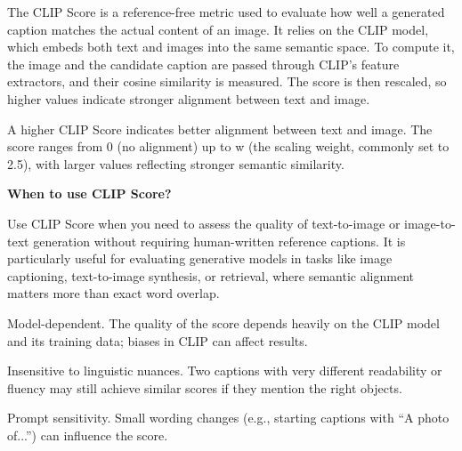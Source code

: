 
The CLIP Score is a reference-free metric used to evaluate how well a generated caption matches the
actual content of an image. It relies on the CLIP model, which embeds both text and images into the same semantic space. To compute it,
the image and the candidate caption are passed through CLIP’s feature extractors, and their cosine similarity is measured. The score is then
rescaled, so higher values indicate stronger alignment between text and image.

\begin{center}
\end{center}

A higher CLIP Score indicates better alignment between text and image. The score ranges from 0 (no alignment) up to w (the scaling weight,
commonly set to 2.5), with larger values reflecting stronger semantic similarity.

\textbf{When to use CLIP Score?}

Use CLIP Score when you need to assess the quality of text-to-image or image-to-text generation without requiring human-written reference captions.
It is particularly useful for evaluating generative models in tasks like image captioning, text-to-image synthesis, or retrieval,
where semantic alignment matters more than exact word overlap.

{
\item Model-dependent. The quality of the score depends heavily on the CLIP model and its training data; biases in CLIP can affect results.
\item Insensitive to linguistic nuances. Two captions with very different readability or fluency may still achieve similar scores
if they mention the right objects.
\item Prompt sensitivity. Small wording changes (e.g., starting captions with “A photo of...”) can influence the score.
}

